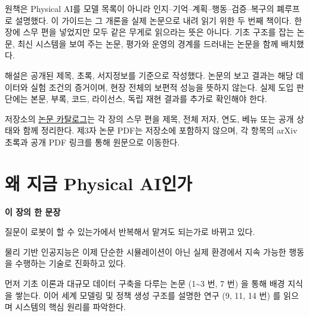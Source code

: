 \documentclass[11pt,openany]{book}
\newcommand{\chaptertakeaway}[1]{%
  \begin{tcolorbox}[
    breakable,
    colback=deepblue,
    colframe=deepblue,
    coltext=white,
    boxrule=0pt,
    arc=2mm,
    left=5mm,right=5mm,top=4mm,bottom=4mm
  ]
  {\sffamily\bfseries\large 이 장의 한 문장}\par\smallskip
  #1
  \end{tcolorbox}
}
\begin{document}

원책은 Physical AI를 모델 목록이 아니라 인지--기억--계획--행동--검증--복구의 폐루프로 설명했다. 이 가이드는 그 개론을 실제 논문으로 내려 읽기 위한 두 번째 책이다. 한 장에 스무 편을 넣었지만 모두 같은 무게로 읽으라는 뜻은 아니다. 기초 구조를 잡는 논문, 최신 시스템을 보여 주는 논문, 평가와 운영의 경계를 드러내는 논문을 함께 배치했다.

\begin{cautionbox}[근거 범위]

해설은 공개된 제목, 초록, 서지정보를 기준으로 작성했다. 논문의 보고 결과는 해당 데이터와 실험 조건의 증거이며, 현장 전체의 보편적 성능을 뜻하지 않는다. 실제 도입 판단에는 본문, 부록, 코드, 라이선스, 독립 재현 결과를 추가로 확인해야 한다.

\end{cautionbox}

\begin{profbox}[연결 자료]

저장소의 \href{https://github.com/gisbi-kim/physical-ai-trends-2026/blob/main/reading-materials/paper-catalog/README.md}{논문 카탈로그}는 각 장의 스무 편을 제목, 전체 저자, 연도, 베뉴 또는 공개 상태와 함께 정리한다. 제3자 논문 PDF는 저장소에 포함하지 않으며, 각 항목의 arXiv 초록과 공개 PDF 링크를 통해 원문으로 이동한다.

\end{profbox}

\tableofcontents

\cleardoublepage

\mainmatter

\chapter{왜 지금 Physical AI인가}

\chaptertakeaway{질문이 로봇이 할 수 있는가에서 반복해서 맡겨도 되는가로 바뀌고 있다.}

물리 기반 인공지능은 이제 단순한 시뮬레이션이 아닌 실제 환경에서 지속 가능한 행동을 수행하는 기술로 진화하고 있다.

\begin{boardbox}[읽는 순서]

먼저 기초 이론과 대규모 데이터 구축을 다루는 논문 (1\textasciitilde{}3 번, 7 번) 을 통해 배경 지식을 쌓는다. 이어 세계 모델링 및 정책 생성 구조를 설명한 연구 (9, 11, 14 번) 를 읽으며 시스템의 핵심 원리를 파악한다.

\end{boardbox}
\end{document}
